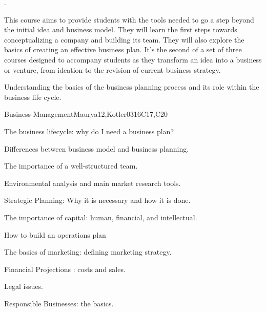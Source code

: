 \begin{syllabus}


\begin{justification}
.
\end{justification}
This course aims to provide students with the tools needed to go a step beyond the initial idea and business model. They will learn the first steps towards conceptualizing a company and building its team. They will also explore the basics of creating an effective business plan. It’s the second of a set of three courses
designed to accompany students as they transform an idea into a business or venture, from ideation to the revision of current business strategy.
\begin{goals}
\item Understanding the basics of the business planning process and its role within the business life cycle.
\end{goals}

\begin{outcomes}
   \item {}
   \item {}
   \item {}
\end{outcomes}

\begin{competences}
    \item {}
    \item {}
    \item {}
\end{competences}

\begin{unit}{Business Management}{}{Maurya12,Kotler03}{16}{C17,C20}
\begin{topics}
      \item The business lifecycle: why do I need a business plan?
      \item Differences between business model and business planning.
      \item The importance of a well-structured team.
      \item Environmental analysis and main market research tools.
      \item Strategic Planning: Why it is necessary and how it is done.
      \item The importance of capital: human, financial, and intellectual.
      \item How to build an operations plan
      \item The basics of marketing: defining marketing strategy.
      \item Financial Projections : costs and sales.
      \item Legal issues.
      \item Responsible Businesses: the basics.
\end{topics}


\end{unit}
\end{syllabus}
